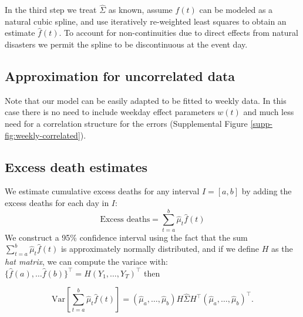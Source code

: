 \documentclass[11pt]{article}
\begin{document}
In the third step we treat $\hat{\Sigma}$ as known, assume $f(t)$ can be modeled as a natural cubic spline, and use iteratively re-weighted least squares to obtain an estimate $\hat{f}(t)$. To account for non-continuities due to direct effects from natural disasters we permit the spline to be discontinuous at the event day. 

\subsection{Approximation for uncorrelated data}
Note that our model can be easily adapted to be fitted to weekly data. In this case there is no need to include weekday effect parameters $w(t)$ and much less need for a correlation structure for the errors (Supplemental Figure \ref{supp-fig:weekly-correlated}). 

\subsection{Excess death estimates}
\label{subsec:excess-deaths}
We estimate cumulative excess deaths for any interval $I = [a, b]$ 
by adding the excess deaths for each day
in $I$: 
\begin{equation*}
    \mbox{Excess deaths} = \sum_{t = a}^b \hat{\mu}_t \hat{f}(t) 
\end{equation*}
We construct a 95\% confidence interval using the fact that the sum $\sum_{t = a}^b \hat{\mu}_t \hat{f}(t)$ is approximately normally distributed, and if we define $H$ as the \emph{hat matrix}, we can compute the variace with:
$\{ \hat{f}(a), \dots \hat{f}(b) \}^\top = H (Y_1, \dots, Y_T)^\top$ then

 \begin{equation*}
    \mbox{Var}\left[\sum_{t = a}^b \hat{\mu}_t \hat{f}(t) \right] = (\hat{\mu}_a,\dots,\hat{\mu}_b) H \hat{\Sigma} H^\top (\hat{\mu}_a,\dots,\hat{\mu}_b)^\top.
 \end{equation*}
 
\end{document}
